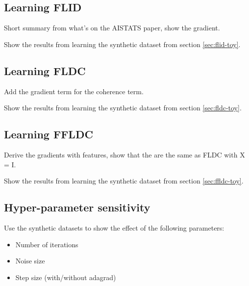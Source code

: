 \subsection{Learning FLID}

Short summary from what's on the AISTATS paper, show the gradient.

Show the results from learning the synthetic dataset from section \ref{sec:flid-toy}.

\subsection{Learning FLDC}

Add the gradient term for the coherence term.

Show the results from learning the synthetic dataset from section \ref{sec:fldc-toy}.

\subsection{Learning FFLDC}

Derive the gradients with features, show that the are the same as FLDC with X = I.

Show the results from learning the synthetic dataset from section \ref{sec:ffldc-toy}.

\subsection{Hyper-parameter sensitivity}

Use the synthetic datasets to show the effect of the following parameters:

\begin{itemize}
  \item Number of iterations
  \item Noise size
  \item Step size (with/without adagrad)
\end{itemize}

